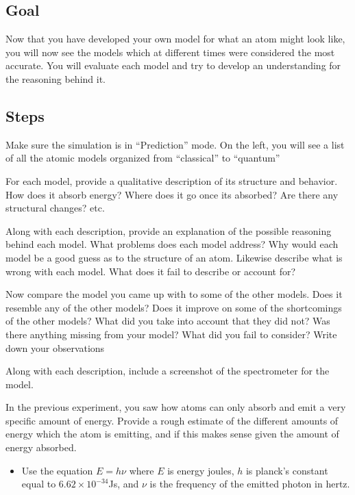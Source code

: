 \subsection{Goal} 
Now that you have developed your own model for what an atom might look like, you will now see the models which at different times were considered the most accurate. You will evaluate each model and try to develop an understanding for the reasoning behind it. 

\subsection{Steps}

\begin{steps}
	\item Make sure the simulation is in ``Prediction'' mode. On the left, you will see a list of all the atomic models organized from ``classical'' to ``quantum''
	
	\item For each model, provide a qualitative description of its structure and behavior. How does it absorb energy? Where does it go once its absorbed? Are there any structural changes? etc. 
	
	\item Along with each description, provide an explanation of the possible reasoning behind each model. What problems does each model address? Why would each model be a good guess as to the structure of an atom. Likewise describe what is wrong with each model. What does it fail to describe or account for?
	
	\item Now compare the model you came up with to some of the other models. Does it resemble any of the other models? Does it improve on some of the shortcomings of the other models? What did you take into account that they did not? Was there anything missing from your model? What did you fail to consider? Write down your observations
	
	\item Along with each description, include a screenshot of the spectrometer for the model. 
	
	\item In the previous experiment, you saw how atoms can only absorb and emit a very specific amount of energy. Provide a rough estimate of the different amounts of energy which the atom is emitting, and if this makes sense given the amount of energy absorbed.
	\begin{itemize}
		\item Use the equation $\mathit{E} = \mathit{h}\nu$ where $\mathit{E}$ is energy joules, $\mathit{h}$ is planck's constant equal to \newline $6.62 \times 10^{-34}$Js, and $\nu$ is the frequency of the emitted photon in hertz.
		

\end{itemize}
\end{steps}
